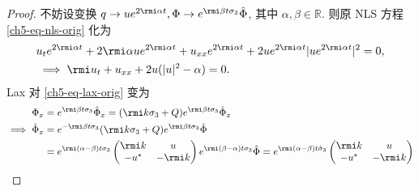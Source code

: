 \begin{proof}
    不妨设变换 $ q \to u e^{2 \rmi \alpha t}, \Phi \to e^{\rmi \beta t \sigma_{3}} \hat{\Phi} $, 其中 $ \alpha, \beta \in \mathbb{R} $. 则原 NLS 方程 \eqref{ch5-eq-nls-orig} 化为
    \begin{equation}
        \begin{aligned}
             & u_{t} e^{2 \rmi \alpha t} + 2 \rmi \alpha u e^{2 \rmi \alpha t} + u_{xx} e^{2 \rmi \alpha t} + 2 u e^{2 \rmi \alpha t} |u e^{2 \rmi \alpha t}|^2 = 0, \\
             & \implies \rmi u_{t} + u_{xx} + 2 u (|u|^2 - \alpha) = 0.
        \end{aligned} \label{ch5-eq-nls-alpha}
    \end{equation}
    Lax 对 \eqref{ch5-eq-lax-orig} 变为
    \begin{equation}
        \begin{aligned}
            \Phi_{x}                & = e^{\rmi \beta t \sigma_{3}} \hat{\Phi}_{x} = (\rmi k \sigma_{3} + Q) e^{\rmi \beta t \sigma_{3}} \hat{\Phi}_{x}                                                                                                    \\
            \implies \hat{\Phi}_{x} & = e^{-\rmi \beta t \sigma_{3}} (\rmi k \sigma_{3} + Q) e^{\rmi \beta t \sigma_{3}} \hat{\Phi}                                                                                                                        \\
                                    & = e^{\rmi (\alpha - \beta) t \sigma_{3}} \begin{pmatrix}
                                                                                   \rmi k & u \\ -u^{*} & -\rmi k
                                                                               \end{pmatrix} e^{\rmi (\beta - \alpha) t \sigma_{3}} \hat{\Phi} = e^{\rmi (\alpha - \beta) t \hat{\sigma}_{3}} \begin{pmatrix} \rmi k & u \\ -u^{*} & -\rmi k \end{pmatrix}

\end{aligned}
\end{equation}
\end{proof}
